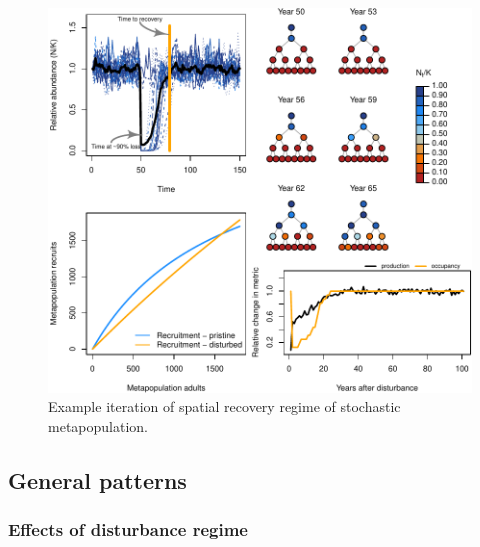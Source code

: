 \documentclass[
]{article}
\begin{document}
\begin{figure}[H]

{\centering \includegraphics{Managing_for_ecological_surprises_in_metapopulations_files/figure-latex/example results4-1} 

}

\caption{Example iteration of spatial recovery regime of stochastic metapopulation.}\label{fig:example results4}
\end{figure}
\newpage

\hypertarget{general-patterns}{%
\subsection{General patterns}\label{general-patterns}}

\hypertarget{effects-of-disturbance-regime}{%
\subsubsection{Effects of disturbance
regime}\label{effects-of-disturbance-regime}}
\end{document}
